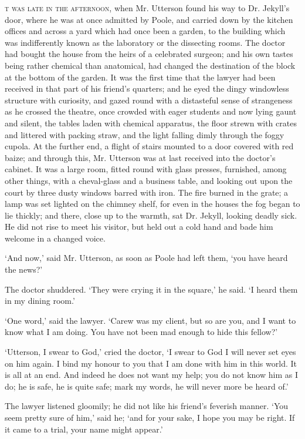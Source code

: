 \documentclass[]{novel}
\begin{document}
\textsc{t was late in the afternoon,} when Mr. Utterson found his way to Dr. Jekyll’s door, where he was at once admitted by Poole, and carried down by the kitchen offices and across a yard which had once been a garden, to the building which was indifferently known as the laboratory or the dissecting rooms. The doctor had bought the house from the heirs of a celebrated surgeon; and his own tastes being rather chemical than anatomical, had changed the destination of the block at the bottom of the garden. It was the first time that the lawyer had been received in that part of his friend’s quarters; and he eyed the dingy windowless structure with curiosity, and gazed round with a distasteful sense of strangeness as he crossed the theatre, once crowded with eager students and now lying gaunt and silent, the tables laden with chemical apparatus, the floor strewn with crates and littered with packing straw, and the light falling dimly through the foggy cupola. At the further end, a flight of stairs mounted to a door covered with red baize; and through this, Mr. Utterson was at last received into the doctor’s cabinet. It was a large room, fitted round with glass presses, furnished, among other things, with a cheval-glass and a business table, and looking out upon the court by three dusty windows barred with iron. The fire burned in the grate; a lamp was set lighted on the chimney shelf, for even in the houses the fog began to lie thickly; and there, close up to the warmth, sat Dr. Jekyll, looking deadly sick. He did not rise to meet his visitor, but held out a cold hand and bade him welcome in a changed voice.

‘And now,’ said Mr. Utterson, as soon as Poole had left them, ‘you have heard the news?’

The doctor shuddered. ‘They were crying it in the square,’ he said. ‘I heard them in my dining room.’

‘One word,’ said the lawyer. ‘Carew was my client, but so are you, and I want to know what I am doing. You have not been mad enough to hide this fellow?’

‘Utterson, I swear to God,’ cried the doctor, ‘I swear to God I will never set eyes on him again. I bind my honour to you that I am done with him in this world. It is all at an end. And indeed he does not want my help; you do not know him as I do; he is safe, he is quite safe; mark my words, he will never more be heard of.’

The lawyer listened gloomily; he did not like his friend’s feverish manner. ‘You seem pretty sure of him,’ said he; ‘and for your sake, I hope you may be right. If it came to a trial, your name might appear.’
\end{document}
